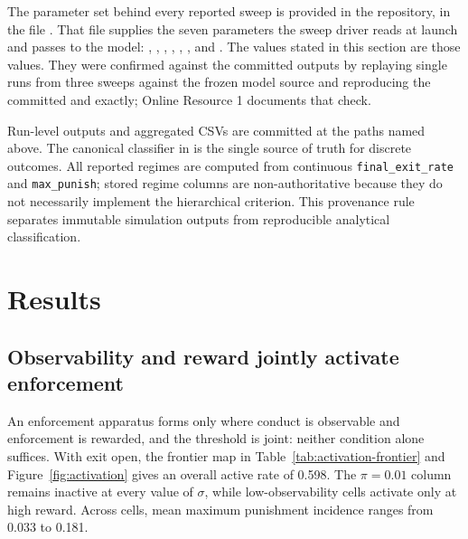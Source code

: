 \documentclass[12pt]{article}
\begin{document}
The parameter set behind every reported sweep is provided in the repository, in
the file . That file supplies the seven
parameters the sweep driver 
reads at launch and passes to the model: ,
, ,
, ,
, and . The values
stated in this section are those values. They were confirmed against the
committed outputs by replaying single runs from three sweeps against the frozen
model source and reproducing the committed  and
 exactly; Online Resource 1 documents that check.

Run-level outputs and aggregated CSVs are committed at the paths named above.
The canonical classifier in  is the single source
of truth for discrete outcomes. All reported regimes are computed from continuous
\texttt{final\_exit\_rate} and \texttt{max\_punish}; stored regime columns are
non-authoritative because they do not necessarily implement the hierarchical
criterion. This provenance rule separates immutable simulation outputs from
reproducible analytical classification.


\section{Results}

\subsection{Observability and reward jointly activate enforcement}

An enforcement apparatus forms only where conduct is observable and enforcement is rewarded, and the threshold is joint: neither condition alone suffices. With exit open, the frontier map in Table~\ref{tab:activation-frontier} and Figure~\ref{fig:activation} gives an overall active rate of 0.598. The \(\pi=0.01\) column remains inactive at every value of \(\sigma\), while low-observability cells activate only at high reward. Across cells, mean maximum punishment incidence ranges from 0.033 to 0.181.
\end{document}
